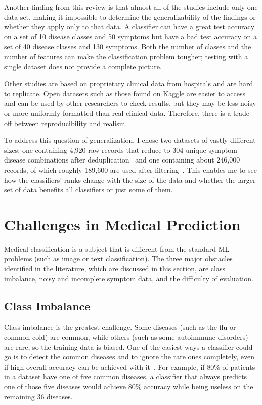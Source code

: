 Another finding from this review is that almost all of the studies include only one data set, making it impossible to determine the generalizability of the findings or whether they apply only to that data. A classifier can have a great test accuracy on a set of 10 disease classes and 50 symptoms but have a bad test accuracy on a set of 40 disease classes and 130 symptoms. Both the number of classes and the number of features can make the classification problem tougher; testing with a single dataset does not provide a complete picture.

Other studies are based on proprietary clinical data from hospitals and are hard to replicate. Open datasets such as those found on Kaggle are easier to access and can be used by other researchers to check results, but they may be less noisy or more uniformly formatted than real clinical data. Therefore, there is a trade-off between reproducibility and realism.

To address this question of generalization, I chose two datasets of vastly different sizes: one containing 4{,}920 raw records that reduce to 304 unique symptom--disease combinations after deduplication~\citep{Kaggle_Disease2020} and one containing about 246{,}000 records, of which roughly 189{,}600 are used after filtering~\citep{Kaggle_Diseases2023}. This enables me to see how the classifiers' ranks change with the size of the data and whether the larger set of data benefits all classifiers or just some of them.

\section{Challenges in Medical Prediction}
\label{sec:challenges}

Medical classification is a subject that is different from the standard ML problems (such as image or text classification). The three major obstacles identified in the literature, which are discussed in this section, are class imbalance, noisy and incomplete symptom data, and the difficulty of evaluation.

\subsection{Class Imbalance}

Class imbalance is the greatest challenge. Some diseases (such as the flu or common cold) are common, while others (such as some autoimmune disorders) are rare, so the training data is biased. One of the easiest ways a classifier could go is to detect the common diseases and to ignore the rare ones completely, even if high overall accuracy can be achieved with it~\citep{Haixiang2017}. For example, if 80\% of patients in a dataset have one of five common diseases, a classifier that always predicts one of those five diseases would achieve 80\% accuracy while being useless on the remaining 36 diseases.

